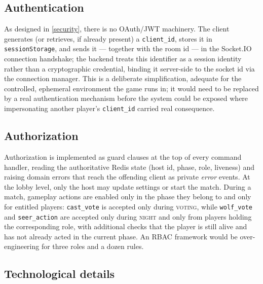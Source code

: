 \documentclass{scrartcl}
\begin{document}
\subsection{Authentication}\label{impl-authentication}

As designed in \cref{security}, there is no OAuth/JWT machinery. The client
generates (or retrieves, if already present) a \texttt{client\_id}, stores it in
\texttt{sessionStorage}, and sends it --- together with the room id --- in the
Socket.IO connection handshake; the backend treats this identifier as a session
identity rather than a cryptographic credential, binding it server-side to the
socket id via the connection manager. This is a deliberate simplification,
adequate for the controlled, ephemeral environment the game runs in; it would
need to be replaced by a real authentication mechanism before the system could be
exposed where impersonating another player's \texttt{client\_id} carried real
consequence.

\subsection{Authorization}\label{impl-authorization}

Authorization is implemented as guard clauses at the top of every command
handler, reading the authoritative Redis state (host id, phase, role, liveness)
and raising domain errors that reach the offending client as private
\emph{error} events. At the lobby level, only the host may update settings or
start the match. During a match, gameplay actions are enabled only in the phase
they belong to and only for entitled players: \texttt{cast\_vote} is accepted
only during \textsc{voting}, while \texttt{wolf\_vote} and \texttt{seer\_action}
are accepted only during \textsc{night} and only from players holding the
corresponding role, with additional checks that the player is still alive and has
not already acted in the current phase. An RBAC framework would be
over-engineering for three roles and a dozen rules.

\subsection{Technological details}\label{technological-details}
\end{document}

